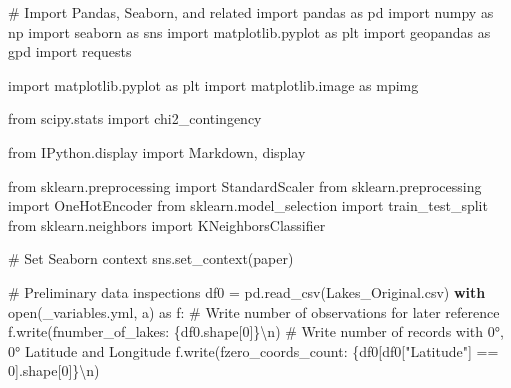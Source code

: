\documentclass[
]{article}
\newenvironment{Shaded}{\begin{snugshade}}{\end{snugshade}}
\newcommand{\BuiltInTok}[1]{\textcolor[rgb]{0.00,0.23,0.31}{#1}}
\newcommand{\CharTok}[1]{\textcolor[rgb]{0.13,0.47,0.30}{#1}}
\newcommand{\CommentTok}[1]{\textcolor[rgb]{0.37,0.37,0.37}{#1}}
\newcommand{\ControlFlowTok}[1]{\textcolor[rgb]{0.00,0.23,0.31}{\textbf{#1}}}
\newcommand{\DecValTok}[1]{\textcolor[rgb]{0.68,0.00,0.00}{#1}}
\newcommand{\ImportTok}[1]{\textcolor[rgb]{0.00,0.46,0.62}{#1}}
\newcommand{\NormalTok}[1]{\textcolor[rgb]{0.00,0.23,0.31}{#1}}
\newcommand{\OperatorTok}[1]{\textcolor[rgb]{0.37,0.37,0.37}{#1}}
\newcommand{\SpecialCharTok}[1]{\textcolor[rgb]{0.37,0.37,0.37}{#1}}
\newcommand{\SpecialStringTok}[1]{\textcolor[rgb]{0.13,0.47,0.30}{#1}}
\newcommand{\StringTok}[1]{\textcolor[rgb]{0.13,0.47,0.30}{#1}}
\begin{document}
\begin{Shaded}
\begin{Highlighting}[]
\CommentTok{\# Import Pandas, Seaborn, and related}
\ImportTok{import}\NormalTok{ pandas }\ImportTok{as}\NormalTok{ pd}
\ImportTok{import}\NormalTok{ numpy }\ImportTok{as}\NormalTok{ np}
\ImportTok{import}\NormalTok{ seaborn }\ImportTok{as}\NormalTok{ sns}
\ImportTok{import}\NormalTok{ matplotlib.pyplot }\ImportTok{as}\NormalTok{ plt}
\ImportTok{import}\NormalTok{ geopandas }\ImportTok{as}\NormalTok{ gpd}
\ImportTok{import}\NormalTok{ requests}

\ImportTok{import}\NormalTok{ matplotlib.pyplot }\ImportTok{as}\NormalTok{ plt}
\ImportTok{import}\NormalTok{ matplotlib.image }\ImportTok{as}\NormalTok{ mpimg}

\ImportTok{from}\NormalTok{ scipy.stats }\ImportTok{import}\NormalTok{ chi2\_contingency}

\ImportTok{from}\NormalTok{ IPython.display }\ImportTok{import}\NormalTok{ Markdown, display}

\ImportTok{from}\NormalTok{ sklearn.preprocessing }\ImportTok{import}\NormalTok{ StandardScaler}
\ImportTok{from}\NormalTok{ sklearn.preprocessing }\ImportTok{import}\NormalTok{ OneHotEncoder}
\ImportTok{from}\NormalTok{ sklearn.model\_selection }\ImportTok{import}\NormalTok{ train\_test\_split}
\ImportTok{from}\NormalTok{ sklearn.neighbors }\ImportTok{import}\NormalTok{ KNeighborsClassifier}

\CommentTok{\# Set Seaborn context}
\NormalTok{sns.set\_context(}\StringTok{\textquotesingle{}paper\textquotesingle{}}\NormalTok{)}

\CommentTok{\# Preliminary data inspections}
\NormalTok{df0 }\OperatorTok{=}\NormalTok{ pd.read\_csv(}\StringTok{\textquotesingle{}Lakes\_Original.csv\textquotesingle{}}\NormalTok{)}
\ControlFlowTok{with} \BuiltInTok{open}\NormalTok{(}\StringTok{\textquotesingle{}\_variables.yml\textquotesingle{}}\NormalTok{, }\StringTok{\textquotesingle{}a\textquotesingle{}}\NormalTok{) }\ImportTok{as}\NormalTok{ f:}
    \CommentTok{\# Write number of observations for later reference}
\NormalTok{    f.write(}\SpecialStringTok{f\textquotesingle{}number\_of\_lakes: }\SpecialCharTok{\{}\NormalTok{df0}\SpecialCharTok{.}\NormalTok{shape[}\DecValTok{0}\NormalTok{]}\SpecialCharTok{\}}\CharTok{\textbackslash{}n}\SpecialStringTok{\textquotesingle{}}\NormalTok{)}
    \CommentTok{\# Write number of records with 0°, 0° Latitude and Longitude}
\NormalTok{    f.write(}\SpecialStringTok{f\textquotesingle{}zero\_coords\_count: }\SpecialCharTok{\{}\NormalTok{df0[df0[}\StringTok{"Latitude"}\NormalTok{] }\OperatorTok{==} \DecValTok{0}\NormalTok{]}\SpecialCharTok{.}\NormalTok{shape[}\DecValTok{0}\NormalTok{]}\SpecialCharTok{\}}\CharTok{\textbackslash{}n}\SpecialStringTok{\textquotesingle{}}\NormalTok{)}
\end{Highlighting}
\end{Shaded}
\end{document}
